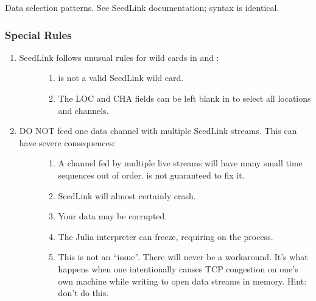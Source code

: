 \documentclass[letterpaper,11pt,english]{sphinxmanual}
\begin{document}
Data selection patterns. See SeedLink documentation; syntax is identical.


\subsubsection{Special Rules}
\label{\detokenize{src/Web/seedlink:special-rules}}\begin{enumerate}
\def\theenumi{\arabic{enumi}}
\def\labelenumi{\theenumi .}
\makeatletter\def\p@enumii{\p@enumi \theenumi .}\makeatother
\item {} \begin{description}
\item[{SeedLink follows unusual rules for wild cards in  and :}] \leavevmode\begin{enumerate}
\def\theenumii{\alph{enumii}}
\def\labelenumii{\theenumii .}
\makeatletter\def\p@enumiii{\p@enumii \theenumii .}\makeatother
\item {} 
\sphinxcode{\sphinxupquote{*}} is not a valid SeedLink wild card.

\item {} 
The LOC and CHA fields can be left blank in  to select all locations and channels.

\end{enumerate}

\end{description}

\item {} \begin{description}
\item[{DO NOT feed one data channel with multiple SeedLink streams. This can have severe consequences:}] \leavevmode\begin{enumerate}
\def\theenumii{\alph{enumii}}
\def\labelenumii{\theenumii .}
\makeatletter\def\p@enumiii{\p@enumii \theenumii .}\makeatother
\item {} 
A channel fed by multiple live streams will have many small time sequences out of order.  is not guaranteed to fix it.

\item {} 
SeedLink will almost certainly crash.

\item {} 
Your data may be corrupted.

\item {} 
The Julia interpreter can freeze, requiring  on the process.

\item {} 
This is not an “issue”. There will never be a workaround. It’s what happens when one intentionally causes TCP congestion on one’s own machine while writing to open data streams in memory. Hint: don’t do this.

\end{enumerate}

\end{description}

\end{enumerate}
\end{document}
